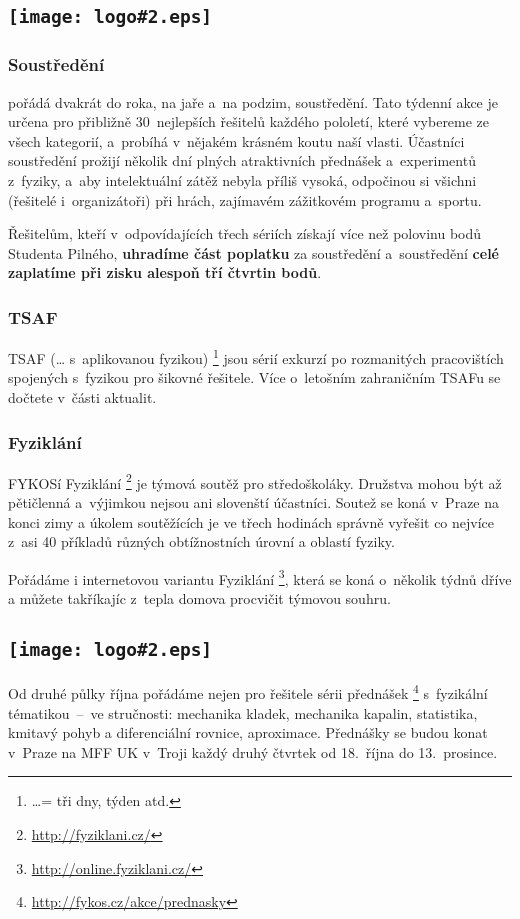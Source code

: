 \documentclass[fykos]{fksempty}
\newlength\logohead
\newcommand\nadpissptakemL[4]{\subsection[#1]{\texttt{[image: logo\#2.eps]} \addtolength{\logohead}{#3}\raisebox{\logohead}{#1}}}
\begin{document}
\nadpissptakemL{Akce {\FYKOS}u}{6}{6mm}{}

\subsubsection{Soustředění}

\FYKOS{} pořádá dvakrát do roka, na jaře a~na podzim,
soustředění. Tato týdenní akce je určena pro přibližně
30~nejlepších řešitelů každého pololetí,
které vybereme ze všech kategorií,
a~probíhá v~nějakém krásném koutu naší vlasti. Účastníci
soustředění prožijí několik dní plných atraktivních přednášek
a~experimentů z~fyziky, a~aby intelektuální zátěž nebyla příliš
vysoká, odpočinou si všichni (řešitelé i~organizátoři) při hrách, 
zajímavém zážitkovém programu a~sportu.

Řešitelům, kteří v~odpovídajících třech sériích získají více
než polovinu bodů Studenta Pilného, \textbf{uhradíme část poplatku}
za soustředění a~soustředění \textbf{celé zaplatíme při zisku alespoň tří
čtvrtin bodů}.
\medskip

\subsubsection{TSAF}
TSAF (\ldots{} s~aplikovanou fyzikou)%
\footnote{\ldots = tři dny, týden atd.}
jsou sérií exkurzí po rozmanitých pracovištích spojených s~fyzikou pro šikovné řešitele.
Více o~letošním zahraničním TSAFu se dočtete v~části aktualit.

\subsubsection{Fyziklání}
FYKOSí Fyziklání%
\footnote{\url{http://fyziklani.cz/}}
je týmová soutěž pro středoškoláky.
Družstva mohou být až pětičlenná a~výjimkou nejsou ani slovenští účastníci.
Soutež se koná v~Praze na konci zimy a úkolem soutěžících
je ve třech hodinách správně vyřešit co nejvíce z~asi 40 příkladů různých
obtížnostních úrovní a oblastí fyziky. 

Pořádáme i internetovou variantu Fyziklání%
\footnote{\url{http://online.fyziklani.cz/}},
která se koná o~několik týdnů dříve a můžete takříkajíc z~tepla domova procvičit týmovou souhru.


\nadpissptakemL{{\FYKOS}í aktuality}{4}{7mm}{}\medskip

Od druhé půlky října pořádáme nejen pro řešitele sérii přednášek%
\footnote{\url{http://fykos.cz/akce/prednasky}}
s~fyzikální
tématikou~–~ve stručnosti: mechanika kladek, mechanika kapalin, statistika, kmitavý pohyb a diferenciální rovnice, aproximace.
Přednášky se budou konat v~Praze na MFF UK v~Troji každý druhý čtvrtek od 18.~října do 13.~prosince.
\end{document}
